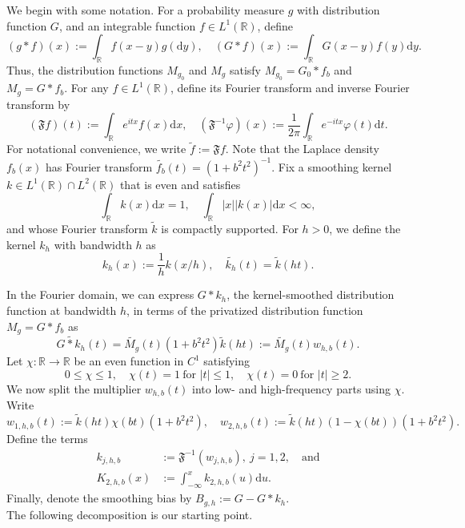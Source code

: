 \documentclass[english, 11pt]{article}
\newcommand{\mrd}{\mathrm{d}}
\newcommand{\FT}[1]{\widetilde{#1}}
\theoremstyle{plain}
\theoremstyle{definition}
\theoremstyle{remark}
\begin{document}
We begin with some notation. 
For a probability measure $g$ with distribution function $G$, and an integrable function $f\in L^1(\mathbb R)$, define
\begin{equation*}
(g*f)(x):=\int_{\mathbb R} f(x-y)g(\mrd y),\quad
(G*f)(x):=\int_{\mathbb R} G(x-y)f(y)\mrd y.
\end{equation*}
Thus, the distribution functions $M_{g_0}$ and $M_g$ satisfy
$M_{g_0}=G_0*f_b$ and $M_g=G*f_b$.
For any $f\in L^1(\mathbb R)$, define its Fourier transform and inverse Fourier transform by
\begin{equation*}
(\mathfrak F f)(t):=\int_{\mathbb R}e^{itx}f(x)\mrd x,\quad
(\mathfrak F^{-1}\varphi)(x):=\frac{1}{2\pi}\int_{\mathbb R}e^{-itx}\varphi(t)\mrd t.
\end{equation*}
For notational convenience, we write $\FT{f}:=\mathfrak F f$.
Note that the Laplace density $f_b(x)$ has Fourier transform
$\FT{f_b}(t)=(1+b^2t^2)^{-1}$.
Fix a smoothing kernel
$k\in L^1(\mathbb R)\cap L^2(\mathbb R)$ that is even and satisfies
\begin{equation*}
\int_{\mathbb R}k(x) \mrd x=1, \quad \int_{\mathbb R}|x| |k(x)| \mrd x<\infty,
\end{equation*}
and whose Fourier transform $\FT{k}$ is compactly supported. 
For $h>0$, we define the kernel $k_h$ with bandwidth $h$ as
\begin{equation*}
k_h(x):=\frac{1}{h}k(x/h), \quad \FT{k_h}(t)=\FT{k}(ht).
\end{equation*}

In the Fourier domain, we can express $G*k_h$, the kernel-smoothed distribution function at bandwidth $h$, in terms of the privatized distribution function $M_g=G*f_b$ as
\begin{equation*}
\FT{G*k_h}(t)=\FT{M_g}(t) (1+b^2t^2)\FT{k}(ht) := \FT{M_g}(t) w_{h,b}(t) .
\end{equation*}
Let $\chi:\mathbb R\to\mathbb R$ be an even function in $C^1$ satisfying
\begin{equation*}
0\le \chi\le 1, \quad \chi(t)=1 \ \text{for } |t|\le 1, \quad \chi(t)=0 \ \text{for } |t|\ge 2.
\end{equation*}
We now split the multiplier $w_{h,b}(t)$ into low- and high-frequency parts using $\chi$. Write
\begin{equation*}
w_{1,h,b}(t):=\FT{k}(ht)\chi(bt)(1+b^2t^2), \quad w_{2,h,b}(t):=\FT{k}(ht)\left(1-\chi(bt)\right)(1+b^2t^2).
\end{equation*}
Define the terms
\begin{align*}
k_{j,h,b} &:=\mathfrak F^{-1}(w_{j,h,b}),\ j=1,2,\quad \text{and} \\
K_{2,h,b}(x) &:=\int_{-\infty}^x k_{2,h,b}(u)\mrd u.
\end{align*}
Finally, denote the smoothing bias by
$B_{g,h}:=G-G*k_h.$ \\
The following decomposition is our starting point.
\end{document}
